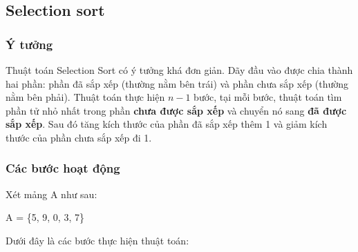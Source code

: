 \subsection{Selection sort}

\subsubsection{Ý tưởng}

Thuật toán Selection Sort có ý tưởng khá đơn giản. Dãy đầu vào được chia thành hai phần: phần đã sắp xếp (thường nằm bên trái) và phần chưa sắp xếp (thường nằm bên phải). Thuật toán thực hiện $n - 1$ bước, tại mỗi bước, thuật toán tìm phần tử nhỏ nhất trong phần \textbf{chưa được sắp xếp} và chuyển nó sang \textbf{đã được sắp xếp}. Sau đó tăng kích thước của phần đã sắp xếp thêm 1 và giảm kích thước của phần chưa sắp xếp đi 1.

\subsubsection{Các bước hoạt động}
Xét mảng A như sau: 
\begin{center}
   A = \{5, 9, 0, 3, 7\} 
\end{center} 
Dưới đây là các bước thực hiện thuật toán:

